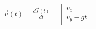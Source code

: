 \documentclass[preview]{standalone}
\begin{document}
\begin{align*}
\vec{v}(t) = \frac{d\vec{s}(t)}{dt} = \begin{bmatrix} v_x \\ v_y - gt \end{bmatrix}
\end{align*}
\end{document}
